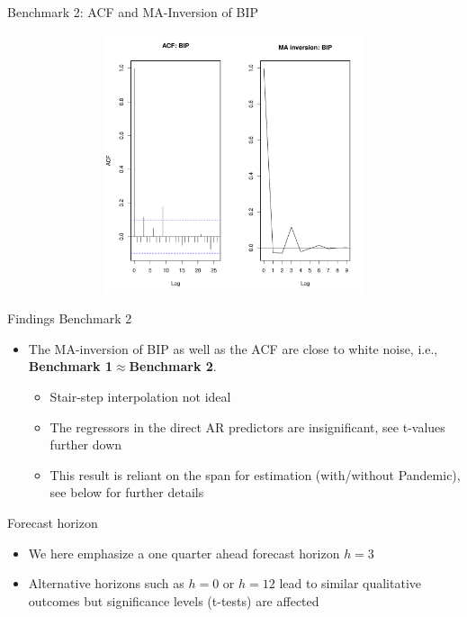 \documentclass{beamer}
\begin{document}
\begin{frame} {Benchmark 2: ACF and MA-Inversion of BIP}
\begin{figure}[H]\begin{center}\includegraphics[height=3in, width=4.5in]{ma_inv_ip.pdf}\caption{\label{data}}\end{center}\end{figure}\end{frame}


\begin{frame} {Findings Benchmark 2}
\begin{itemize}
\item The MA-inversion of BIP as well as the ACF are close to white noise, i.e., \textbf{Benchmark 1$\approx$Benchmark 2}.
\begin{itemize}
\item Stair-step interpolation not ideal 
\item The regressors in the direct AR predictors are insignificant, see t-values further down
\item This result is reliant on the span for estimation (with/without Pandemic), see below for further details
\end{itemize}
\end{itemize}
\end{frame}


\begin{frame} {Forecast horizon}
\begin{itemize}
\item We here emphasize a one quarter ahead forecast horizon $h=3$
\item Alternative horizons such as $h=0$ or $h=12$ lead to similar qualitative outcomes but significance levels (t-tests) are affected
\end{itemize}
\end{frame}
\end{document}
